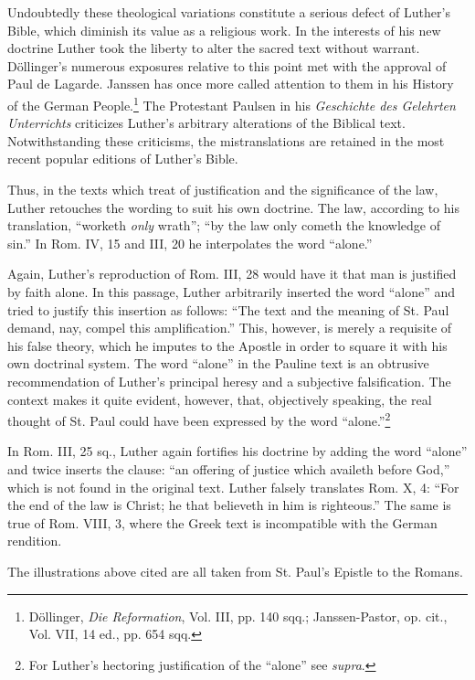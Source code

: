 Undoubtedly these theological variations constitute a serious defect
of Luther’s Bible, which diminish its value as a religious work. In the
interests of his new doctrine Luther took the liberty to alter the
sacred text without warrant. Döllinger’s numerous exposures relative
to this point met with the approval of Paul de Lagarde. Janssen has
once more called attention to them in his History of the German
People.\footnote{Döllinger, \textit{Die Reformation}, Vol. III, pp. 140 sqq.; Janssen-Pastor, op. cit., Vol. VII,
14 ed., pp. 654 sqq.}
The Protestant Paulsen in his \textit{Geschichte des Gelehrten Unterrichts}
criticizes Luther’s arbitrary alterations of the Biblical text.
Notwithstanding these criticisms, the mistranslations are retained in
the most recent popular editions of Luther’s Bible.

Thus, in the texts which treat of justification and the significance of the
law, Luther retouches the wording to suit his own doctrine. The law, according
to his translation, “worketh \textit{only} wrath”; “by the law only cometh
the knowledge of sin.” In Rom. IV, 15 and III, 20 he interpolates the word
“alone.”

Again, Luther’s reproduction of Rom. III, 28 would have it that man is
justified by faith alone. In this passage, Luther arbitrarily inserted the word
“alone” and tried to justify this insertion as follows: “The text and the
meaning of St. Paul demand, nay, compel this amplification.” This, however,
is merely a requisite of his false theory, which he imputes to the Apostle in
order to square it with his own doctrinal system. The word “alone” in
the Pauline text is an obtrusive recommendation of Luther’s principal
heresy and a subjective falsification. The context makes it quite evident,
however, that, objectively speaking, the real thought of St. Paul could have
been expressed by the word ``alone.''\footnote
{For Luther’s hectoring justification of the “alone” see \textit{supra}.}

In Rom. III, 25 sq., Luther again fortifies his doctrine by adding the
word “alone” and twice inserts the clause: “an offering of justice which
availeth before God,” which is not found in the original text. Luther falsely
translates Rom. X, 4: “For the end of the law is Christ; he that believeth in
him is righteous.” The same is true of Rom. VIII, 3, where the Greek text
is incompatible with the German rendition.

The illustrations above cited are all taken from St. Paul’s Epistle to the
Romans.

